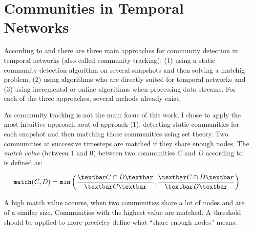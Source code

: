 \section{Communities in Temporal Networks}
\label{sec:bg:tracking}
According to \textcite{aynaud2013communities} and \textcite{brodka2014community} there are three main approaches for community detection in temporal networks (also called community tracking): (1) using a static community detection algorithm on several snapshots and then solving a matchig problem, (2) using algorithms who are directly suited for temporal networks and (3) using incremental or online algorithms when processing data streams. For each of the three approaches, several mehods already exist.

As community tracking is not the main focus of this work, I chose to apply the most intuitive approach aout of approach (1): detecting static communities for each snapshot and then matching those communities using set theory.  Two communities at successive timesteps are matched if they share enough nodes. The \emph{match value} (between 1 and 0) between two communities $C$ and $D$ according to~\cite{hopcroft2004tracking} is defined as:

\begin{equation}
\label{eq:match}
\texttt{match}(C,D) = \texttt{min}\left( \frac{\textbar C\cap D \textbar}{\textbar C\textbar }, \frac{\textbar C\cap D \textbar}{\textbar D \textbar }\right)
\end{equation}

A high match value accurse, when two communities share a lot of nodes and are of a similar size. Communities with the highest value are matched. A threshold should be applied to more precicley define what ``share enough nodes'' means.
